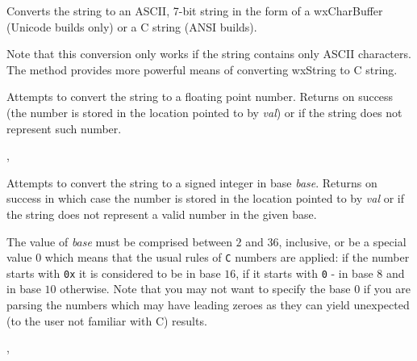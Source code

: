 \label{wxstringtoascii}



Converts the string to an ASCII, 7-bit string in the form of
a wxCharBuffer (Unicode builds only) or a C string (ANSI builds).

Note that this conversion only works if the string contains only ASCII
characters. The  method provides more
powerful means of converting wxString to C string.


\label{wxstringtodouble}


Attempts to convert the string to a floating point number. Returns \true on
success (the number is stored in the location pointed to by {\it val}) or \false
if the string does not represent such number.


,\\


\label{wxstringtolong}


Attempts to convert the string to a signed integer in base {\it base}. Returns
\true on success in which case the number is stored in the location
pointed to by {\it val} or \false if the string does not represent a
valid number in the given base.

The value of {\it base} must be comprised between $2$ and $36$, inclusive, or
be a special value $0$ which means that the usual rules of {\tt C} numbers are
applied: if the number starts with {\tt 0x} it is considered to be in base
$16$, if it starts with {\tt 0} - in base $8$ and in base $10$ otherwise. Note
that you may not want to specify the base $0$ if you are parsing the numbers
which may have leading zeroes as they can yield unexpected (to the user not
familiar with C) results.


,\\


